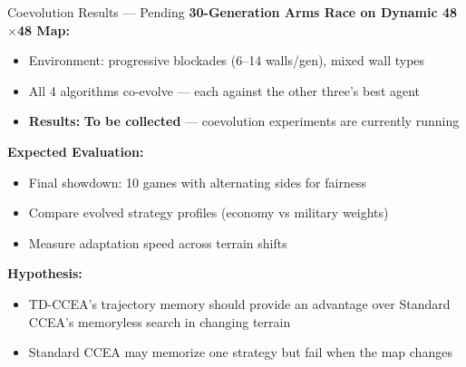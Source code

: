 \documentclass[aspectratio=169, 11pt]{beamer}
\begin{document}
\begin{frame}{Coevolution Results --- \textcolor{progAmber}{Pending}}
\small
\textbf{30-Generation Arms Race on Dynamic 48$\times$48 Map:}
\begin{itemize}
    \item Environment: progressive blockades (6--14 walls/gen), mixed wall types
    \item All 4 algorithms co-evolve --- each against the other three's best agent
    \item \textbf{Results:} \textcolor{progAmber}{\textbf{To be collected}} --- coevolution experiments are currently running
\end{itemize}
\vspace{0.2cm}
\textbf{Expected Evaluation:}
\begin{itemize}
    \item Final showdown: 10 games with alternating sides for fairness
    \item Compare evolved strategy profiles (economy vs military weights)
    \item Measure adaptation speed across terrain shifts
\end{itemize}
\vspace{0.2cm}
\textbf{Hypothesis:}
\begin{itemize}
    \item TD-CCEA's trajectory memory should provide an advantage over Standard CCEA's memoryless search in changing terrain
    \item Standard CCEA may memorize one strategy but fail when the map changes
\end{itemize}
\end{frame}
\end{document}
